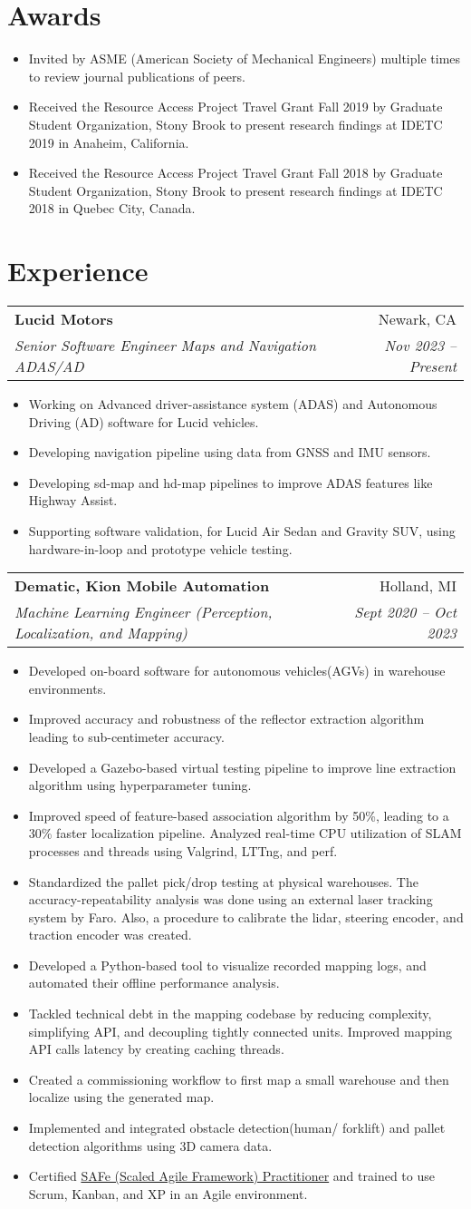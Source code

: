 \documentclass[letterpaper,10pt]{article}
\makeatletter
\newcommand{\resumeHeading}[4]{
  \vspace{-1pt}
    \begin{tabular*}{0.97\textwidth}{l@{\extracolsep{\fill}}r}
      \textbf{#1} & #2 \vspace{-2pt}\\ \vspace{1pt}
      \textit{\small#3} & \textit{\small #4} \\
    \end{tabular*}
}
\newcommand{\resumeSection}[1]{
\vspace{-12pt}
\section{\textbf{#1}}
}
\newcommand{\resumeItemListStart}{
\vspace{-7pt}
\begin{itemize}[leftmargin=14pt]
}
\newcommand{\resumeItemListEnd}{
\vspace{+7pt}
\end{itemize}
}
\newcommand{\resumeItem}[1]{
  \item\small{
      {#1 \vspace{-7pt}
      }
  }
}
\makeatother
\begin{document}
\resumeSection{Awards}
\vspace{+7pt}

\resumeItemListStart
\resumeItem{Invited by ASME (American Society of Mechanical Engineers) multiple times to review journal publications of peers.}
\resumeItem{Received the Resource Access Project Travel Grant Fall 2019 by Graduate Student Organization, Stony Brook to present research findings at IDETC 2019 in Anaheim, California.}
\resumeItem{Received the Resource Access Project Travel Grant Fall 2018 by Graduate Student Organization, Stony Brook to present research findings at IDETC 2018 in Quebec City, Canada.}
\resumeItemListEnd



\resumeSection{Experience}

\resumeHeading
{Lucid Motors}{Newark, CA}
{Senior Software Engineer Maps and Navigation ADAS/AD}{Nov 2023 -- Present}
\resumeItemListStart
\resumeItem{Working on Advanced driver-assistance system (ADAS) and Autonomous Driving (AD) software for Lucid vehicles.}
\resumeItem{Developing navigation pipeline using data from GNSS and IMU sensors.}
\resumeItem{Developing sd-map and hd-map pipelines to improve ADAS features like Highway Assist.}
\resumeItem{Supporting software validation, for Lucid Air Sedan and Gravity SUV, using hardware-in-loop and prototype vehicle testing.}
\resumeItemListEnd

\resumeHeading
{Dematic, Kion Mobile Automation}{Holland, MI}
{Machine Learning Engineer (Perception, Localization, and Mapping)}{Sept 2020 -- Oct 2023}
\resumeItemListStart
\resumeItem{Developed  on-board software for autonomous vehicles(AGVs) in warehouse environments.}
\resumeItem{Improved accuracy and robustness of the reflector extraction algorithm leading to sub-centimeter accuracy.}
\resumeItem{Developed a Gazebo-based virtual testing pipeline to improve line extraction algorithm using hyperparameter tuning.}
\resumeItem{Improved speed of feature-based association algorithm by 50\%, leading to a 30\% faster localization pipeline. Analyzed real-time CPU utilization of SLAM processes and threads using Valgrind, LTTng, and perf.}
\resumeItem{Standardized the pallet pick/drop testing at physical warehouses. The accuracy-repeatability analysis was done using an external laser tracking system by Faro. Also, a procedure to calibrate the lidar, steering encoder, and traction encoder was created.}
\resumeItem{Developed a Python-based tool to visualize recorded mapping logs, and automated their offline performance analysis.}
\resumeItem{Tackled technical debt in the mapping codebase by reducing complexity, simplifying API, and decoupling tightly connected units. Improved mapping API calls latency by creating caching threads.}
\resumeItem{Created a commissioning workflow to first map a small warehouse and then localize using the generated map.}
\resumeItem{Implemented and integrated obstacle detection(human/ forklift) and pallet detection algorithms using 3D camera data.}
\resumeItem{Certified \href{https://www.youracclaim.com/go/eCNozIcD}{SAFe (Scaled Agile Framework) Practitioner} and trained to use Scrum, Kanban, and XP in an Agile environment.}
\resumeItemListEnd
\end{document}
